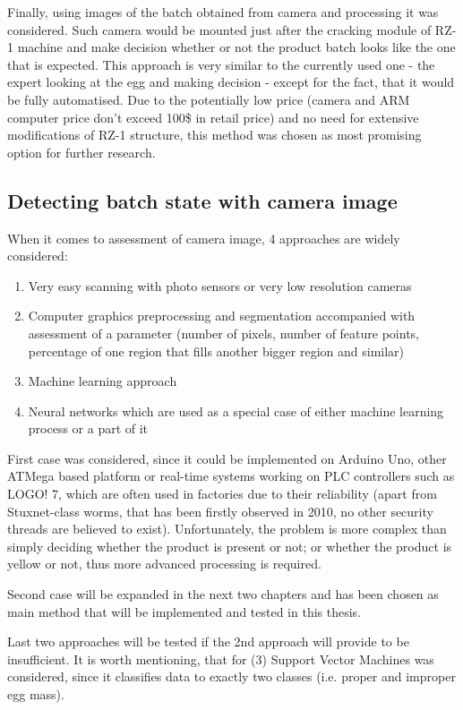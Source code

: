 \documentclass[12pt,twoside,a4paper]{article}
\begin{document}
Finally, using images of the batch obtained from camera and processing it was considered. Such camera would be mounted just after the cracking module of RZ-1 machine and make decision whether or not the product batch looks like the one that is expected.
This approach is very similar to the currently used one - the expert looking at the egg and making decision - except for the fact, that it would be fully automatised.
Due to the potentially low price (camera and ARM computer price don't exceed 100\$ in retail price) and no need for extensive modifications of RZ-1 structure, this method was chosen as most promising option for further research.



\subsection{Detecting batch state with camera image}

When it comes to assessment of camera image, 4 approaches are widely considered:
\begin{enumerate}
\item Very easy scanning with photo sensors or very low resolution cameras
\item Computer graphics preprocessing and segmentation accompanied with assessment of a parameter (number of pixels, number of feature points, percentage of one region that fills another bigger region and similar)
\item Machine learning approach
\item Neural networks which are used as a special case of either machine learning process or a part of it 
\end{enumerate}
First case was considered, since it could be implemented on Arduino Uno, other ATMega based platform or real-time systems working on PLC controllers such as LOGO! 7, which are often used in factories due to their reliability (apart from Stuxnet-class worms, that has been firstly observed in 2010, no other security threads are believed to exist).
Unfortunately, the problem is more complex than simply deciding whether the product is present or not; or whether the product is yellow or not, thus more advanced processing is required.

Second case will be expanded in the next two chapters and has been chosen as main method that will be implemented and tested in this thesis.

Last two approaches will be tested if the 2nd approach will provide to be insufficient.
It is worth mentioning, that for (3) Support Vector Machines was considered, since it classifies data to exactly two classes (i.e. proper and improper egg mass).
\end{document}
